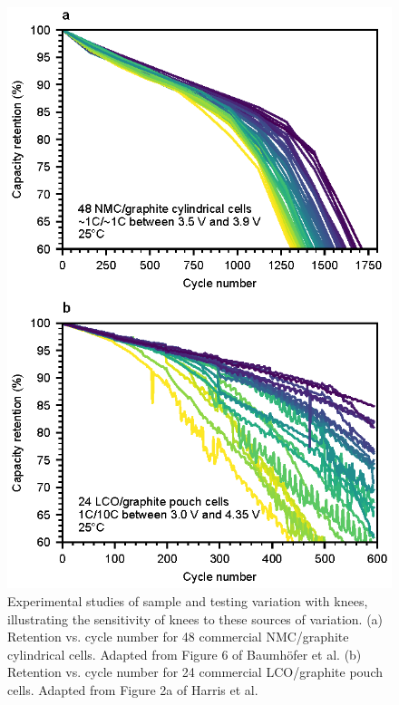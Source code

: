 \documentclass[journal=jpclcd,manuscript=article]{achemso}
\begin{document}
\begin{figure}[ht!]
\centering
\includegraphics[scale=1]{figures/variation_exp.eps}
\caption{Experimental studies of sample and testing variation with knees, illustrating the sensitivity of knees to these sources of variation.
(a) Retention vs. cycle number for 48 commercial NMC/graphite cylindrical cells. Adapted from Figure 6 of Baumhöfer et al. \cite{baumhofer_production_2014}
(b) Retention vs. cycle number for 24 commercial LCO/graphite pouch cells. Adapted from Figure 2a of Harris et al.\cite{harris_failure_2017}
}
\label{fig:var_exp}
\end{figure}
\end{document}
